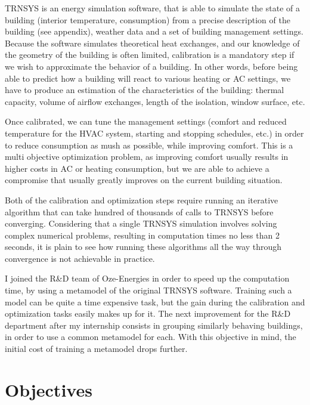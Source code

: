 \documentclass[12pt]{article}
\begin{document}
TRNSYS is an energy simulation software, that is able to simulate the state of a building (interior temperature, consumption) from a precise description of the building (see appendix), weather data and a set of building management settings. Because the software simulates theoretical heat exchanges, and our knowledge of the geometry of the building is often limited, calibration is a mandatory step if we wish to approximate the behavior of a building. In other words, before being able to predict how a building will react to various heating or AC settings, we have to produce an estimation of the characteristics of the building: thermal capacity, volume of airflow exchanges, length of the isolation, window surface, etc.

Once calibrated, we can tune the management settings (comfort and reduced temperature for the HVAC system, starting and stopping schedules, etc.) in order to reduce consumption as mush as possible, while improving comfort. This is a multi objective optimization problem, as improving comfort usually results in higher costs in AC or heating consumption, but we are able to achieve a compromise that usually greatly improves on the current building situation.

Both of the calibration and optimization steps require running an iterative algorithm that can take hundred of thousands of calls to TRNSYS before converging. Considering that a single TRNSYS simulation involves solving complex numerical problems, resulting in computation times no less than 2 seconds, it is plain to see how running these algorithms all the way through convergence is not achievable in practice.

I joined the R\&D team of Oze-Energies in order to speed up the computation time, by using a metamodel of the original TRNSYS software. Training such a model can be quite a time expensive task, but the gain during the calibration and optimization tasks easily makes up for it. The next improvement for the R\&D department after my internship consists in grouping similarly behaving buildings, in order to use a common metamodel for each. With this objective in mind, the initial cost of training a metamodel drops further.

\section{Objectives}
\label{sec:objectives}
\end{document}
